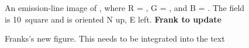 \pagebreak





\clearpage




\startlongtable

\clearpage






\pagebreak



\clearpage

\startlongtable



\pagebreak
%


\begin{figure}
\caption{An emission-line image of \gal, where R = \ha, G = \sii, and B = \oiii.  The field is 10\arcmin\ square and is oriented N up, E left.  {\bf Frank to update} }
\end{figure}

\begin{figure}
\caption{Franks's new figure. This needs to be integrated into the text \label{fig_overview}}
\end{figure}



